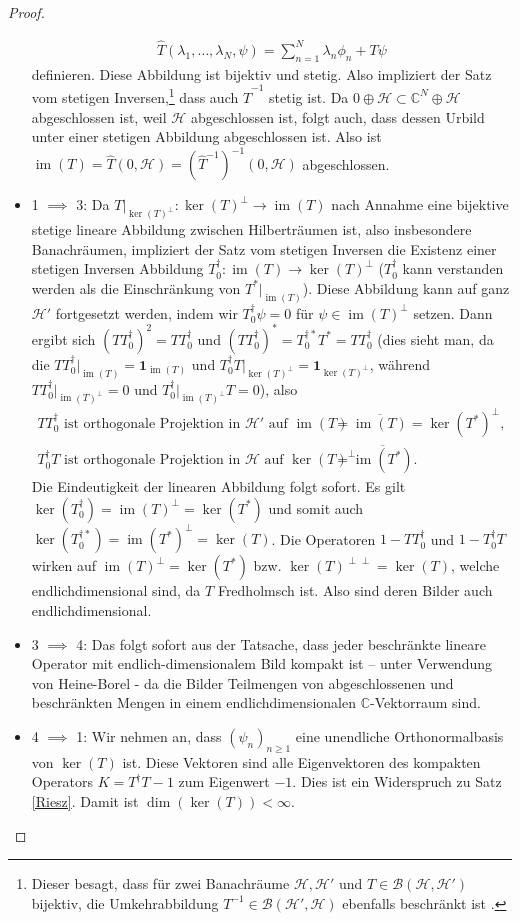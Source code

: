 \documentclass[11pt, hidelinks]{article}
\newcommand{\h}{\mathcal{H}}
\newcommand{\im}{\operatorname{im}}
\numberwithin{conj}{section}
\begin{document}
\begin{proof}
\begin{itemize}
    \begin{align}
        \hat{T}(\lambda_1, \ldots, \lambda_N, \psi) = \sum_{n=1}^{N} \lambda_n \phi_n + T\psi
    \end{align}
    definieren. Diese Abbildung ist bijektiv und stetig. Also impliziert der Satz vom stetigen Inversen,\footnote{Dieser besagt, dass für zwei Banachräume $\h,\h'$ und $T \in \mathcal{B}(\h,\h')$ bijektiv, die Umkehrabbildung $T^{-1} \in \mathcal{B}(\h',\h)$ ebenfalls beschränkt ist \cite[Korollar 3.24]{lechner}.} dass auch $\hat{T}^{-1}$ stetig ist. Da $0 \oplus \h \subset \mathbb{C}^N \oplus \h$ abgeschlossen ist, weil $\h$ abgeschlossen ist, folgt auch, dass dessen Urbild unter einer stetigen Abbildung abgeschlossen ist. Also ist $\im(T) = \hat{T}(0,\h) = (\hat{T}^{-1})^{-1}(0,\h)$ abgeschlossen.
    \item 1 $\implies$ 3: Da $T\vert_{\ker(T)^\perp}: \ker(T)^\perp \to \im(T)$ nach Annahme eine bijektive stetige lineare Abbildung zwischen Hilberträumen ist, also insbesondere Banachräumen, impliziert der Satz vom stetigen Inversen \cite[Korollar 3.24]{lechner} die Existenz einer stetigen Inversen Abbildung $T^\dagger_0: \im(T) \to \ker(T)^\perp$ ($T^\dagger_0$ kann verstanden werden als die Einschränkung von $T^\ast\vert_{\im(T)}$). Diese Abbildung kann auf ganz $\h'$ fortgesetzt werden, indem wir $T^\dagger_0 \psi = 0$ für $\psi \in \im(T)^\perp$ setzen. Dann ergibt sich $(TT^\dagger_0)^2 = TT^\dagger_0$ und $(TT^\dagger_0)^\ast = T^{\dagger\ast}_0 T^\ast =  TT^\dagger_0$ (dies sieht man, da die $TT^\dagger_0\vert_{\im(T)} = \mathbf{1}_{\im(T)}$ und $T^\dagger_0T\vert_{\ker(T)^\perp} = \mathbf{1}_{\ker(T)^\perp}$, während $TT^\dagger_0\vert_{\im(T)^\perp} = 0$ und $T^\dagger_0\vert_{\im(T)^\perp}T = 0$), also
    \begin{align*}
        TT^\dagger_0  \text{ ist orthogonale Projektion in $\h'$ auf } \im(T) &= \overline{\im(T)} = \ker(T^\ast)^\perp, \\
        T^\dagger_0 T \text{ ist orthogonale Projektion in $\h$ auf } \ker(T)^\perp &= \overline{\im(T^\ast)}.
    \end{align*}
    Die Eindeutigkeit der linearen Abbildung folgt sofort. Es gilt $\ker(T_0^\dagger) = \im(T)^\perp = \ker(T^\ast)$ und somit auch $\ker(T_0^{\dagger\ast}) = \im(T^\ast)^\perp = \ker(T)$. Die Operatoren $1-TT^\dagger_0$ und $1-T^\dagger_0 T$ wirken auf $\im(T)^\perp = \ker(T^\ast)$ bzw. $\ker(T)^{\perp\perp} = \ker(T)$, welche endlichdimensional sind, da $T$ Fredholmsch ist. Also sind deren Bilder auch endlichdimensional.
    \item 3 $\implies$ 4: Das folgt sofort aus der Tatsache, dass jeder beschränkte lineare Operator mit endlich-dimensionalem Bild kompakt ist -- unter Verwendung von Heine-Borel - da die Bilder Teilmengen von abgeschlossenen und beschränkten Mengen in einem endlichdimensionalen $\mathbb{C}$-Vektorraum sind.
    \item 4 $\implies$ 1: Wir nehmen an, dass $(\psi_n)_{n \geq 1}$ eine unendliche Orthonormalbasis von $\ker(T)$ ist. Diese Vektoren sind alle Eigenvektoren des kompakten Operators $K = T^\dagger T -1$ zum Eigenwert $-1$. Dies ist ein Widerspruch zu Satz \ref{Riesz}. Damit ist $\dim(\ker(T)) < \infty$.


\end{itemize}
\end{proof}
\end{document}

